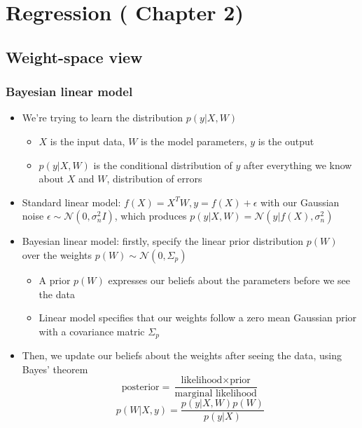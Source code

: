 \documentclass[12pt]{article}
\begin{document}
\section{Regression (\cite{gp-ml} Chapter 2)}

\subsection{Weight-space view}

\subsubsection{Bayesian linear model}
\begin{itemize}
    \item We're trying to learn the distribution $p(y|X,W)$
    \begin{itemize}
        \item $X$ is the input data, $W$ is the model parameters, $y$ is the output
        \item $p(y|X,W)$ is the conditional distribution of $y$ after everything we know about $X$ and $W$, distribution of errors
    \end{itemize}
    \item Standard linear model: $f(X) = X^T W, y = f(X) + \epsilon$ with our Gaussian noise $\epsilon \sim \mathcal{N}(0, \sigma^2_nI)$, which produces $p(y|X,W) = \mathcal{N}(y|f(X), \sigma^2_n)$
    \item Bayesian linear model: firstly, specify the linear prior distribution $p(W)$ over the weights $p(W) \sim \mathcal{N}(0, \Sigma_p)$
    \begin{itemize}
        \item A prior $p(W)$ expresses our beliefs about the parameters before we see the data
        \item Linear model specifies that our weights follow a zero mean Gaussian prior with a covariance matric $\Sigma_p$
    \end{itemize}
    \item Then, we update our beliefs about the weights after seeing the data, using Bayes' theorem
\begin{equation}
    \text{posterior} = \frac{\text{likelihood} \times \text{prior}}{\text{marginal likelihood}}
\end{equation}
\begin{equation}
    p(W|X, y) = \frac{p(y|X,W)p(W)}{p(y|X)}
\end{equation}
    \begin{itemize}

\end{itemize}
\end{itemize}
\end{document}

